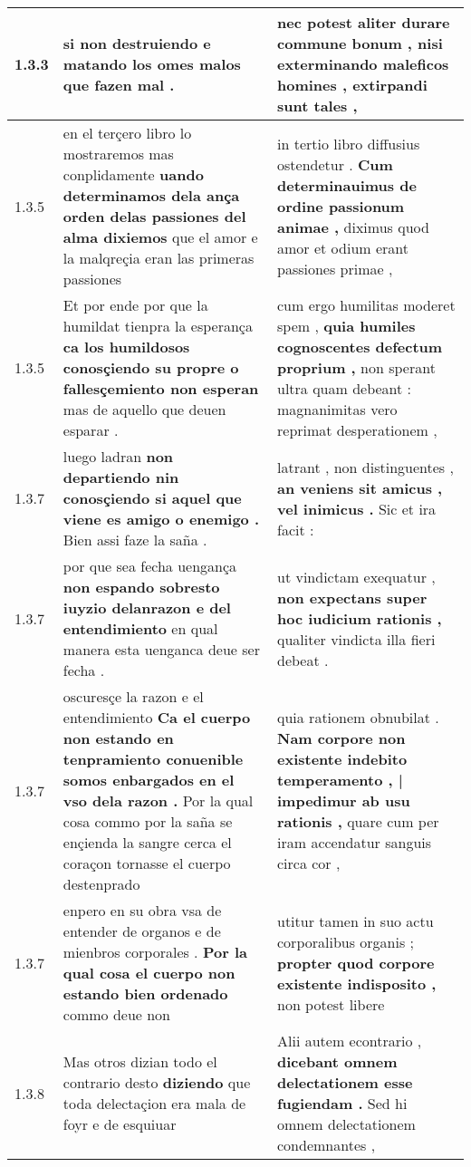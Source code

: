 \begin{tabular}{|p{1cm}|p{6.5cm}|p{6.5cm}|}
1.3.3 & si non destruiendo \textbf{ e matando los omes malos } que fazen mal . & nec potest aliter durare commune bonum , \textbf{ nisi exterminando maleficos homines , } extirpandi sunt tales , \\\hline
1.3.5 & en el terçero libro lo mostraremos mas conplidamente \textbf{ uando determinamos dela ança orden delas passiones del alma dixiemos } que el amor e la malqreçia eran las primeras passiones & in tertio libro diffusius ostendetur . \textbf{ Cum determinauimus de ordine passionum animae , } diximus quod amor et odium erant passiones primae , \\\hline
1.3.5 & Et por ende por que la humildat tienpra la esperança \textbf{ ca los humildosos conosçiendo su propre o fallesçemiento non esperan } mas de aquello que deuen esparar . & cum ergo humilitas moderet spem , \textbf{ quia humiles cognoscentes defectum proprium , } non sperant ultra quam debeant : magnanimitas vero reprimat desperationem , \\\hline
1.3.7 & luego ladran \textbf{ non departiendo nin conosçiendo si aquel que viene es amigo o enemigo . } Bien assi faze la saña . & latrant , non distinguentes , \textbf{ an veniens sit amicus , vel inimicus . } Sic et ira facit : \\\hline
1.3.7 & por que sea fecha uengança \textbf{ non espando sobresto iuyzio delanrazon e del entendimiento } en qual manera esta uenganca deue ser fecha . & ut vindictam exequatur , \textbf{ non expectans super hoc iudicium rationis , } qualiter vindicta illa fieri debeat . \\\hline
1.3.7 & oscuresçe la razon e el entendimiento \textbf{ Ca el cuerpo non estando en tenpramiento conuenible somos enbargados en el vso dela razon . } Por la qual cosa commo por la saña se ençienda la sangre cerca el coraçon tornasse el cuerpo destenprado & quia rationem obnubilat . \textbf{ Nam corpore non existente indebito temperamento , | impedimur ab usu rationis , } quare cum per iram accendatur sanguis circa cor , \\\hline
1.3.7 & enpero en su obra vsa de entender de organos e de mienbros corporales . \textbf{ Por la qual cosa el cuerpo non estando bien ordenado } commo deue non & utitur tamen in suo actu corporalibus organis ; \textbf{ propter quod corpore existente indisposito , } non potest libere \\\hline
1.3.8 & Mas otros dizian todo el contrario desto \textbf{ diziendo } que toda delectaçion era mala de foyr e de esquiuar & Alii autem econtrario , \textbf{ dicebant omnem delectationem esse fugiendam . } Sed hi omnem delectationem condemnantes , \\\hline

\end{tabular}
